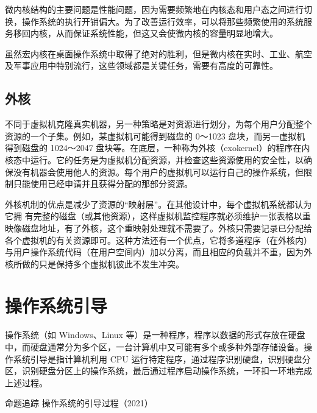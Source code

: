 \documentclass{ctexbook}
\begin{document}
		微内核结构的主要问题是性能问题，因为需要频繁地在内核态和用户态之间进行切换，操作系统的执行开销偏大。为了改善运行效率，可以将那些频繁使用的系统服务移回内核，从而保证系统性能，但这又会使微内核的容量明显地增大。
		
		虽然宏内核在桌面操作系统中取得了绝对的胜利，但是微内核在实时、工业、航空及军事应用中特别流行，这些领域都是关键任务，需要有高度的可靠性。
		
		\subsection{外核}
		不同于虚拟机克隆真实机器，另一种策略是对资源进行划分，为每个用户分配整个资源的一个子集。例如，某虚拟机可能得到磁盘的 0～1023 盘块，而另一虚拟机得到磁盘的 1024～2047 盘块等。在底层，一种称为外核（exokernel）的程序在内核态中运行。它的任务是为虚拟机分配资源，并检查这些资源使用的安全性，以确保没有机器会使用他人的资源。每个用户的虚拟机可以运行自己的操作系统，但限制只能使用已经申请并且获得分配的那部分资源。
		
		外核机制的优点是减少了资源的“映射层”。在其他设计中，每个虚拟机系统都认为它拥
		有完整的磁盘（或其他资源），这样虚拟机监控程序就必须维护一张表格以重映像磁盘地址，有了外核，这个重映射处理就不需要了。外核只需要记录已分配给各个虚拟机的有关资源即可。这种方法还有一个优点，它将多道程序（在外核内）与用户操作系统代码（在用户空间内）加以分离，而且相应的负载并不重，因为外核所做的只是保持多个虚拟机彼此不发生冲突。
		
		\section{操作系统引导}
		操作系统（如 Windows、Linux 等）是一种程序，程序以数据的形式存放在硬盘中，而硬盘通常分为多个区，一台计算机中又可能有多个或多种外部存储设备。操作系统引导是指计算机利用 CPU 运行特定程序，通过程序识别硬盘，识别硬盘分区，识别硬盘分区上的操作系统，最后通过程序启动操作系统，一环扣一环地完成上述过程。
		
		\colorbox{gray!20}{命题追踪 \enspace 操作系统的引导过程（2021）}
		
\end{document}
